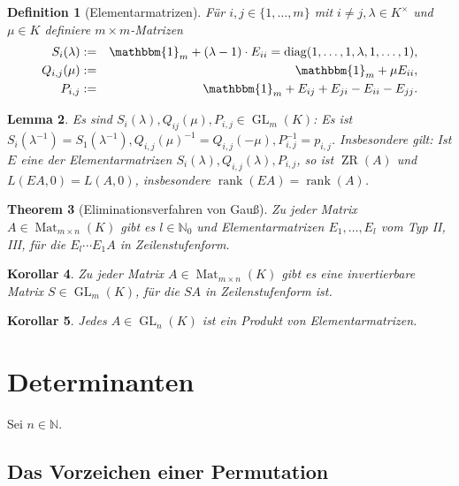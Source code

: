 \documentclass[ngerman,a4paper]{report}
\theoremstyle{changebreak}
\newtheorem{theorem}{Theorem}[section]
\newtheorem{corollar}[theorem]{Korollar}
\newtheorem{lemma}[theorem]{Lemma}
\newtheorem{definition}[theorem]{Definition}
\DeclareMathOperator{\Mat}{Mat}
\DeclareMathOperator{\diag}{diag}
\DeclareMathOperator{\GL}{GL}
\DeclareMathOperator{\rk}{rank}
\DeclareMathOperator{\ZR}{ZR}
\begin{document}
\begin{definition}[Elementarmatrizen]
    Für $i,j \in \{1,\dots,m\}$ mit $i\neq j, \lambda\in K^{\times}$ und $\mu \in K$ definiere $m\times m$-Matrizen
    \begin{eqnarray*}
        S_i(\lambda) &:=& \mathbbm{1}_m +(\lambda -1)\cdot E_{ii} = \diag(1,\dots,1,\lambda,1,\dots,1),\\
            Q_{i,j}(\mu) &:=& \mathbbm{1}_m + \mu E_{ii},\\
            P_{i,j} &:=& \mathbbm{1}_m + E_{ij} + E_{ji} - E_{ii} - E_{jj}.
    \end{eqnarray*}
\end{definition}

\begin{lemma}
    Es sind $S_i(\lambda), Q_{ij}(\mu), P_{i,j}\in \GL_m(K)$: Es ist $S_i(\lambda^{-1})=S_{1}(\lambda^{-1}), Q_{i,j}(\mu)^{-1} = Q_{i,j}(-\mu),P_{i,j}^{-1}=p_{i,j}$. Insbesondere gilt: Ist $E$ eine der Elementarmatrizen $S_i(\lambda), Q_{i,j}(\lambda),P_{i,j}$, so ist $\ZR(A)$ und $L(EA,0) = L(A,0)$, insbesondere $\rk(EA)=\rk(A)$.
\end{lemma}

\begin{theorem}[Eliminationsverfahren von Gauß]
    Zu jeder Matrix $A\in \Mat_{m\times n}(K)$ gibt es $l \in \mathbb{N}_{0}$ und Elementarmatrizen $E_1,\dots,E_l$ vom Typ II, III, für die $E_l\cdots E_1 A$ in Zeilenstufenform.
\end{theorem}

\addtocounter{theorem}{1}

\begin{corollar}
    Zu jeder Matrix $A\in \Mat_{m\times n}(K)$ gibt es eine invertierbare Matrix $S\in \GL_m(K)$, für die $SA$ in Zeilenstufenform ist.
\end{corollar}

\addtocounter{theorem}{1}

\begin{corollar}
    Jedes $A\in \GL_n(K)$ ist ein Produkt von Elementarmatrizen.
\end{corollar}

\chapter{Determinanten}
Sei $n \in \mathbb{N}$.

\section{Das Vorzeichen einer Permutation}
\end{document}

